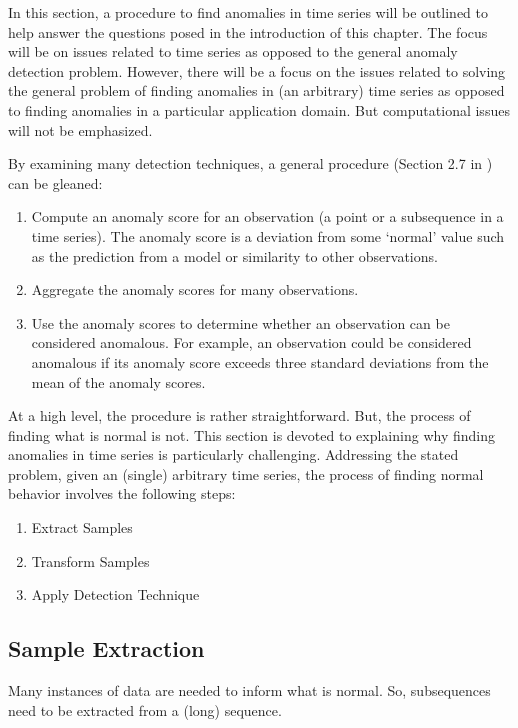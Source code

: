 In this section, a procedure to find anomalies in time series will be outlined to help answer the questions posed in the introduction of this chapter. The focus will be on issues related to time series as opposed to the general anomaly detection problem. However, there will be a focus on the issues related to solving the general problem of finding anomalies in (an arbitrary) time series as opposed to finding anomalies in a particular application domain. But computational issues will not be emphasized.

By examining many detection techniques, a general procedure (Section 2.7 in \cite{Cheboli2010}) can be gleaned:

\begin{enumerate}
\item Compute an anomaly score for an observation (a point or a subsequence in a time series). The anomaly score is a deviation from some `normal' value such as the prediction from a model or similarity to other observations.
\item Aggregate the anomaly scores for many observations.
\item Use the anomaly scores to determine whether an observation can be considered anomalous. For example, an observation could be considered anomalous if its anomaly score exceeds three standard deviations from the mean of the anomaly scores.
\end{enumerate}

At a high level, the procedure is rather straightforward. But, the process of finding what is normal is not. This section is devoted to explaining why finding anomalies in time series is particularly challenging. Addressing the stated problem, given an (single) arbitrary time series, the process of finding normal behavior involves the following steps:
\begin{enumerate}
\item Extract Samples
\item Transform Samples
\item Apply Detection Technique
\end{enumerate}

\subsection{Sample Extraction}
\label{sec:adsample}

Many instances of data are needed to inform what is normal. So, subsequences need to be extracted from a (long) sequence.

